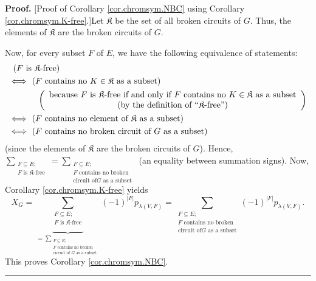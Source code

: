 \documentclass[numbers=enddot,12pt,final,onecolumn,notitlepage]{scrartcl}%
\theoremstyle{definition}
\newenvironment{proof}[1][Proof]{\noindent\textbf{#1.} }{\ \rule{0.5em}{0.5em}}
\newenvironment{verlong}{}{}
\let\sumnonlimits\sum
\renewcommand{\sum}{\sumnonlimits\limits}
\begin{document}
\begin{verlong}
\begin{proof}
[Proof of Corollary \ref{cor.chromsym.NBC} using Corollary
\ref{cor.chromsym.K-free}.]Let $\mathfrak{K}$ be the set of all broken
circuits of $G$. Thus, the elements of $\mathfrak{K}$ are the broken circuits
of $G$.

Now, for every subset $F$ of $E$, we have the following equivalence of
statements:%
\begin{align*}
&  \ \left(  F\text{ is }\mathfrak{K}\text{-free}\right) \\
&  \Longleftrightarrow\ \left(  F\text{ contains no }K\in\mathfrak{K}\text{ as
a subset}\right) \\
&  \ \ \ \ \ \ \ \ \ \ \left(
\begin{array}
[c]{c}%
\text{because }F\text{ is }\mathfrak{K}\text{-free if and only if }F\text{
contains no }K\in\mathfrak{K}\text{ as a subset}\\
\text{(by the definition of \textquotedblleft}\mathfrak{K}%
\text{-free\textquotedblright)}%
\end{array}
\right) \\
&  \Longleftrightarrow\ \left(  F\text{ contains no element of }%
\mathfrak{K}\text{ as a subset}\right) \\
&  \Longleftrightarrow\ \left(  F\text{ contains no broken circuit of }G\text{
as a subset}\right)
\end{align*}
(since the elements of $\mathfrak{K}$ are the broken circuits of $G$). Hence,
$\sum_{\substack{F\subseteq E;\\F\text{ is }\mathfrak{K}\text{-free}}%
}=\sum_{\substack{F\subseteq E;\\F\text{ contains no broken}\\\text{circuit of
}G\text{ as a subset}}}$ (an equality between summation signs). Now, Corollary
\ref{cor.chromsym.K-free} yields%
\[
X_{G}=\underbrace{\sum_{\substack{F\subseteq E;\\F\text{ is }\mathfrak{K}%
\text{-free}}}}_{=\sum_{\substack{F\subseteq E;\\F\text{ contains no
broken}\\\text{circuit of }G\text{ as a subset}}}}\left(  -1\right)
^{\left\vert F\right\vert }p_{\lambda\left(  V,F\right)  }=\sum
_{\substack{F\subseteq E;\\F\text{ contains no broken}\\\text{circuit of
}G\text{ as a subset}}}\left(  -1\right)  ^{\left\vert F\right\vert
}p_{\lambda\left(  V,F\right)  }.
\]
This proves Corollary \ref{cor.chromsym.NBC}.
\end{proof}
\end{verlong}
\end{document}
